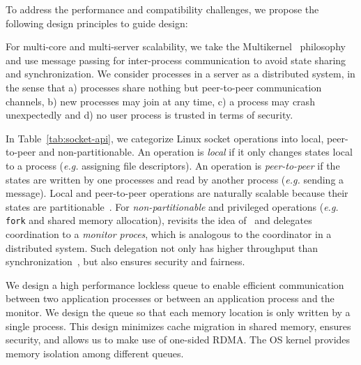 To address the performance and compatibility challenges, we propose the following design principles to guide \sys design:

For multi-core and multi-server scalability, we take the Multikernel~\cite{baumann2009multikernel} philosophy and use message passing for inter-process communication to avoid state sharing and synchronization. We consider processes in a server as a distributed system, in the sense that a) processes share nothing but peer-to-peer communication channels, b) new processes may join at any time, c) a process may crash unexpectedly and d) no user process is trusted in terms of security. 

In Table~\ref{tab:socket-api}, we categorize Linux socket operations into local, peer-to-peer and non-partitionable. An operation is \textit{local} if it only changes states local to a process (\textit{e.g.} assigning file descriptors). An operation is \textit{peer-to-peer} if the states are written by one processes and read by another process (\textit{e.g.} sending a message). 
Local and peer-to-peer operations are naturally scalable because their states are partitionable~\cite{partitionable}. For \textit{non-partitionable} and privileged operations (\textit{e.g.} \texttt{fork} and shared memory allocation), \sys revisits the idea of~\cite{hoare1974monitors} and delegates coordination to a \emph{monitor proces}, which is analogous to the coordinator in a distributed system. Such delegation not only has higher throughput than synchronization~\cite{roghanchi2017ffwd}, but also ensures security and fairness.

We design a high performance lockless queue to enable efficient communication between two application processes or between an application process and the monitor. We design the queue so that each memory location is only written by a single process. This design minimizes cache migration in shared memory, ensures security, and allows us to make use of one-sided RDMA. The OS kernel provides memory isolation among different queues. 

